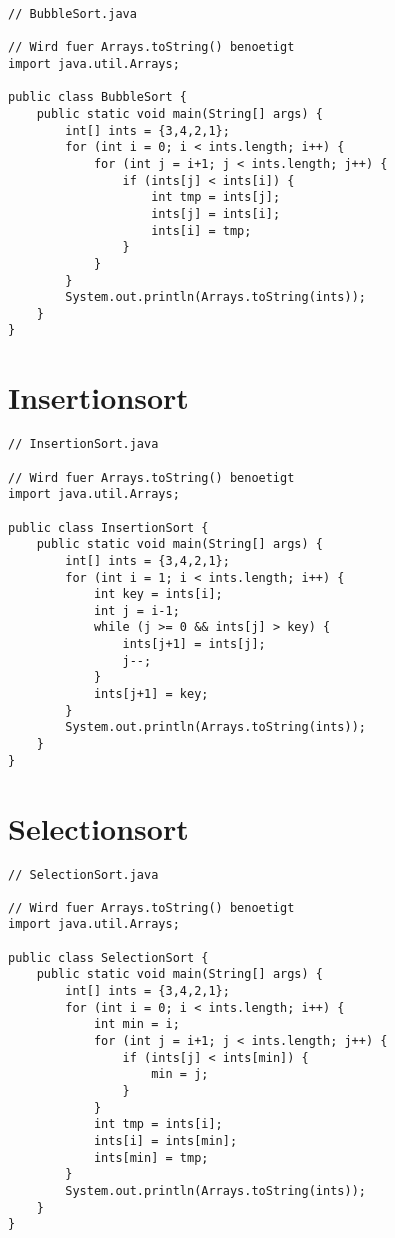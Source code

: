 \begin{center}  
\begin{lstlisting}
// BubbleSort.java

// Wird fuer Arrays.toString() benoetigt
import java.util.Arrays;

public class BubbleSort {
    public static void main(String[] args) {
        int[] ints = {3,4,2,1};
        for (int i = 0; i < ints.length; i++) {
            for (int j = i+1; j < ints.length; j++) {
                if (ints[j] < ints[i]) {
                    int tmp = ints[j];
                    ints[j] = ints[i];
                    ints[i] = tmp;
                }
            }
        }
        System.out.println(Arrays.toString(ints));
    }
}
\end{lstlisting}
\end{center}

\section{Insertionsort}
\begin{center}
\begin{lstlisting}
// InsertionSort.java

// Wird fuer Arrays.toString() benoetigt
import java.util.Arrays;

public class InsertionSort {
    public static void main(String[] args) {
        int[] ints = {3,4,2,1};
        for (int i = 1; i < ints.length; i++) {
            int key = ints[i];
            int j = i-1;
            while (j >= 0 && ints[j] > key) {
                ints[j+1] = ints[j];
                j--;
            }
            ints[j+1] = key;
        }
        System.out.println(Arrays.toString(ints));
    }
}
\end{lstlisting}
\end{center}

\section{Selectionsort}
\begin{center}
\begin{lstlisting}
// SelectionSort.java

// Wird fuer Arrays.toString() benoetigt
import java.util.Arrays;

public class SelectionSort {
    public static void main(String[] args) {
        int[] ints = {3,4,2,1};
        for (int i = 0; i < ints.length; i++) {
            int min = i;
            for (int j = i+1; j < ints.length; j++) {
                if (ints[j] < ints[min]) {
                    min = j;
                }
            }
            int tmp = ints[i];
            ints[i] = ints[min];
            ints[min] = tmp;
        }
        System.out.println(Arrays.toString(ints));
    }
}
\end{lstlisting}
\end{center}


